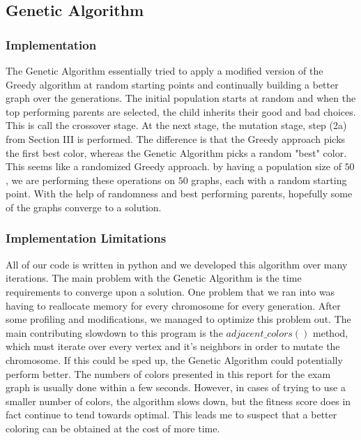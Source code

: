 \documentclass[12]{article}
\begin{document}
\subsection{Genetic Algorithm}
\subsubsection{Implementation}
The Genetic Algorithm essentially tried to apply a modified version of the Greedy algorithm at random starting points and continually building a better graph over the generations. The initial population starts at random and when the top performing parents are selected, the child inherits their good and bad choices. This is call the crossover stage. At the next stage, the mutation stage, step (2a) from Section III is performed. The difference is that the Greedy approach picks the first best color, whereas the Genetic Algorithm picks a random "best" color. This seems like a randomized Greedy approach. by having a population size of $50$, we are performing these operations on $50$ graphs, each with a random starting point. With the help of randomness and best performing parents, hopefully some of the graphs converge to a solution.

\subsubsection{Implementation Limitations}
All of our code is written in python and we developed this algorithm over many iterations. The main problem with the Genetic Algorithm is the time requirements to converge upon a solution. One problem that we ran into was having to reallocate memory for every chromosome for every generation. After some profiling and modifications, we managed to optimize this problem out. The main contributing slowdown to this program is the $adjacent\_colors()$ method, which must iterate over every vertex and it's neighbors in order to mutate the chromosome. If this could be sped up, the Genetic Algorithm could potentially perform better. The numbers of colors presented in this report for the exam graph is usually done within a few seconds. However, in cases of trying to use a smaller number of colors, the algorithm slows down, but the fitness score does in fact continue to tend towards optimal. This leads me to suspect that a better coloring can be obtained at the cost of more time.
\end{document}
